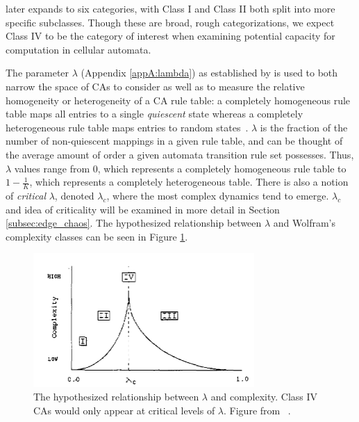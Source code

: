 \documentclass[a4paper,11pt,twoside]{report}
\begin{document}
\citeauthor{li90b} later expands to six categories, with Class I and Class II both split into more specific subclasses. Though these are broad, rough categorizations, we expect Class IV to be the category of interest when examining potential capacity for computation in cellular automata.

\medskip
The parameter $\lambda$ (Appendix \ref{appA:lambda}) as established by \citeauthor{la90} is used to both narrow the space of CAs to consider as well as to measure the relative homogeneity or heterogeneity of a CA rule table: a completely homogeneous rule table maps all entries to a single \textit{quiescent} state whereas a completely heterogeneous rule table maps entries to random states~\cite{la90}. $\lambda$ is the fraction of the number of non-quiescent mappings in a given rule table, and can be thought of the average amount of order a given automata transition rule set possesses. Thus, $\lambda$ values range from $0$, which represents a completely homogeneous rule table to $1 - \frac{1}{K}$, which represents a completely heterogeneous table. There is also a notion of \textit{critical} $\lambda$, denoted $\lambda_c$, where the most complex dynamics tend to emerge. $\lambda_c$ and idea of criticality will be examined in more detail in Section \ref{subsec:edge_chaos}. The hypothesized relationship between $\lambda$ and Wolfram's complexity classes can be seen in Figure \ref{fig:wolfram}.

\begin{figure}[htp]
	\centering
	\includegraphics[width=0.75\textwidth]{la90_fig16_wolfram_classes.png}
	\caption[Wolfram's Complexity Classes]{
	The hypothesized relationship between $\lambda$ and complexity. Class IV CAs would only appear at critical levels of $\lambda$. Figure from \citeauthor{la90}~\cite{la90}.
	}
	\label{fig:wolfram}
\end{figure}

\medskip
\end{document}
